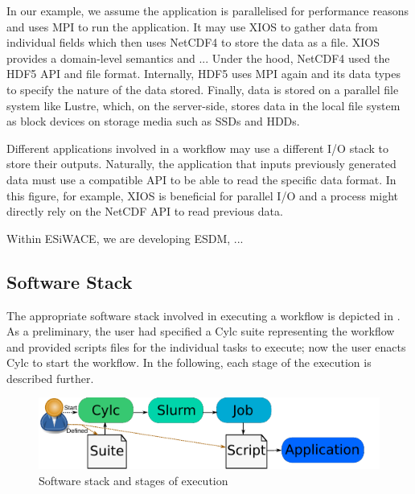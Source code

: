 \documentclass[a4paper]{article}
\newcommand{\jk}[1]{\todo[inline]{JK: #1}}
\begin{document}
\begin{minipage}{0.7\textwidth}
In our example, we assume the application is parallelised for performance reasons and uses MPI to run the application.
It may use XIOS to gather data from individual fields which then uses NetCDF4 to store the data as a file.
XIOS provides a domain-level semantics and ...\jk{TODO}
Under the hood, NetCDF4 used the HDF5 API and file format.
Internally, HDF5 uses MPI again and its data types to specify the nature of the data stored.
Finally, data is stored on a parallel file system like Lustre, which, on the server-side, stores data in the local file system as block devices on storage media such as SSDs and HDDs.

Different applications involved in a workflow may use a different I/O stack to store their outputs.
Naturally, the application that inputs previously generated data must use a compatible API to be able to read the specific data format.
In this figure, for example, XIOS is beneficial for parallel I/O and a process might directly rely on the NetCDF API to read previous data.

Within ESiWACE, we are developing ESDM, ... \jk{TODO}
\end{minipage}



\subsection{Software Stack}

The appropriate software stack involved in executing a workflow is depicted in .
As a preliminary, the user had specified a Cylc suite representing the workflow and provided scripts files for the individual tasks to execute; now the user enacts Cylc to start the workflow.
In the following, each stage of the execution is described further.

\begin{figure}[H]
  \centering
  \includegraphics[scale=1.4]{stages}
  \caption{Software stack and stages of execution}
  \label{fig:stages}
\end{figure}
\end{document}
